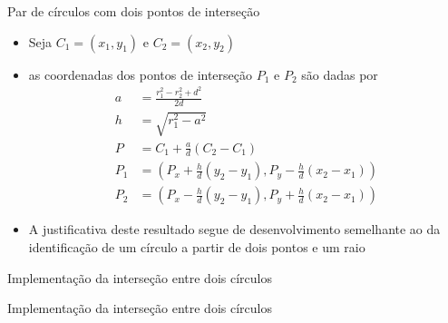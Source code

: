 \begin{frame}[fragile]{Par de círculos com dois pontos de interseção}

    \begin{itemize}
        \item Seja $C_1 = (x_1, y_1)$ e $C_2 = (x_2, y_2)$

        \item as coordenadas dos pontos de interseção $P_1$ e $P_2$ são dadas por
        \begin{align*}
            a &= \frac{r_1^2 - r_2^2 + d^2}{2d}\\
            h &= \sqrt{r_1^2 - a^2} \\
            P &= C_1 + \frac{a}{d}(C_2 - C_1) \\
            P_1 &= \left(P_x + \frac{h}{d}(y_2 - y_1), P_y - \frac{h}{d}(x_2 - x_1)\right) \\
            P_2 &= \left(P_x - \frac{h}{d}(y_2 - y_1), P_y + \frac{h}{d}(x_2 - x_1)\right)
        \end{align*}

        \item A justificativa deste resultado segue de desenvolvimento semelhante ao da 
            identificação de um círculo a partir de dois pontos e um raio
        
    \end{itemize}

\end{frame}

\begin{frame}[fragile]{Implementação da interseção entre dois círculos}
\end{frame}

\begin{frame}[fragile]{Implementação da interseção entre dois círculos}
\end{frame}
